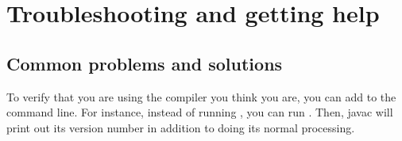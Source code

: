\section{Troubleshooting and getting help\label{troubleshooting}}

\subsection{Common problems and solutions}

To verify that you are using the compiler you think you are, you can add
 to the command line.  For instance, instead of running
, you can run .  Then, javac will print out its version number in addition
to doing its normal processing.


